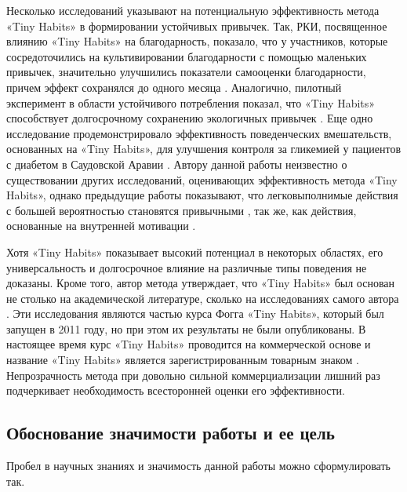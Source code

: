 \documentclass[pdflatex,sn-mathphys-num]{sn-jnl}%
\theoremstyle{thmstyleone}%
\theoremstyle{thmstyletwo}%
\theoremstyle{thmstylethree}%
\begin{document}
Несколько исследований указывают на потенциальную эффективность метода «Tiny Habits» в формировании устойчивых привычек. Так, РКИ, посвященное влиянию «Tiny Habits» на благодарность, показало, что у участников, которые сосредоточились на культивировании благодарности с помощью маленьких привычек, значительно улучшились показатели самооценки благодарности, причем эффект сохранялся до одного месяца \cite{Hollingsworth2022Tiny}. Аналогично, пилотный эксперимент в области устойчивого потребления показал, что «Tiny Habits» способствует долгосрочному сохранению экологичных привычек \cite{OHalloran2024Small}. Еще одно исследование продемонстрировало эффективность поведенческих вмешательств, основанных на «Tiny Habits», для улучшения контроля за гликемией у пациентов с диабетом в Саудовской Аравии \cite{alqutub_2025}. Автору данной работы неизвестно о существовании других исследований, оценивающих эффективность метода «Tiny Habits», однако предыдущие работы показывают, что легковыполнимые действия с большей вероятностью становятся привычными \cite{lally_2010, https://doi.org/10.1348/014466605X49122}, так же, как действия, основанные на внутренней мотивации \cite{Judah2018Exploratory, phillips_2016}.

Хотя «Tiny Habits» показывает высокий потенциал в некоторых областях, его универсальность и долгосрочное влияние на различные типы поведения не доказаны. Кроме того, автор метода утверждает, что «Tiny Habits» был основан не столько на академической литературе, сколько на исследованиях самого автора \cite{tiny_habits_references}. Эти исследования являются частью курса Фогга «Tiny Habits», который был запущен в 2011 году, но при этом их результаты не были опубликованы. В настоящее время курс «Tiny Habits» проводится на коммерческой основе и название «Tiny Habits» является зарегистрированным товарным знаком \cite{noauthor_bj_nodate, noauthor_permissions_nodate}. Непрозрачность метода при довольно сильной коммерциализации лишний раз подчеркивает необходимость всесторонней оценки его эффективности.

\subsection{Обоснование значимости работы и ее цель}\label{Goal}

Пробел в научных знаниях и значимость данной работы можно сформулировать так.
\end{document}
